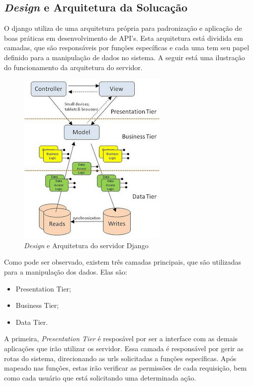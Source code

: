 \subsection{\textit{Design} e Arquitetura da Solucação}
\label{sub:design_e_arquitetura_da_soluca_o}

O django utiliza de uma arquitetura própria para padronização e aplicação de boas
práticas em desenvolvimento de API's. Esta arquitetura está dividida em camadas,
que são responsáveis por funções específicas e cada uma tem seu papel definido
para a manipulação de dados no sistema. A seguir está uma ilustração do funcionamento
da arquitetura do servidor. 

\begin{figure}
    \begin{center}
        \includegraphics[scale=1]{figuras/rest_arch.jpg}
    \end{center}
    \caption{\textit{Design} e Arquitetura do servidor Django}
    \label{fig:rest_arch}
\end{figure}

Como pode ser observado, existem três camadas principais, que são utilizadas
para a manipulação dos dados. Elas são:

\begin{itemize}
    \item Presentation Tier;
    \item Business Tier;
    \item Data Tier.
\end{itemize}

A primeira, \textit{Presentation Tier} é resposável por ser a interface com as demais aplicações
que irão utilizar os servidor. Essa camada é responsável por gerir as rotas do sistema, direcionando
as urls solicitadas a funções específicas. Após mapeado nas funções, estas irão verificar as permissões
de cada requisição, bem como cada usuário que está solicitando uma determinada ação.


